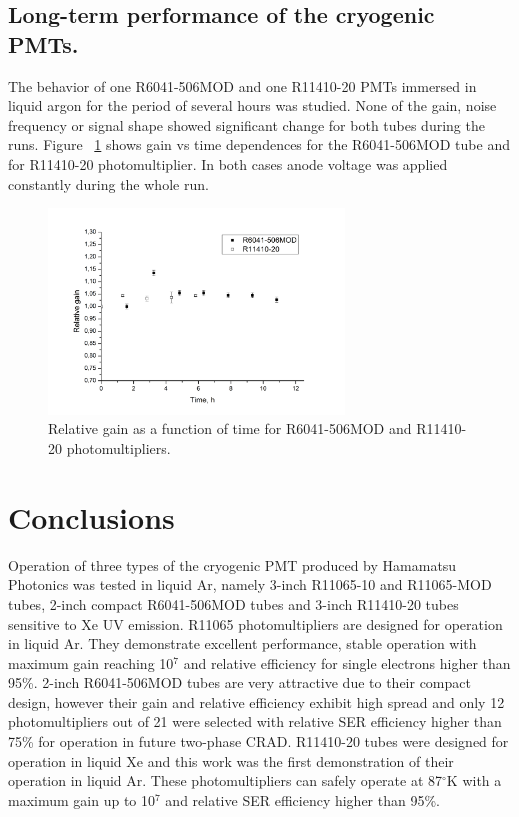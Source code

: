 \documentclass[a4paper,11pt]{article}
\begin{document}
\subsection{Long-term performance of the cryogenic PMTs.}

The behavior of one R6041-506MOD and one R11410-20 PMTs immersed in liquid argon for the
period of several hours was studied. None of the gain, noise frequency or signal shape showed
significant change for both tubes during the runs. Figure ~\ref{fig:long_runs} shows gain vs time dependences for the
R6041-506MOD tube  and for R11410-20 photomultiplier. In both cases anode voltage was applied constantly during the whole run.
\begin{figure}[htbp]
\centering
\includegraphics[width=0.7\textwidth,viewport=100 1 700 550,clip]{figures/long_runs.png}
\caption{Relative gain as a function of time for R6041-506MOD and R11410-20 photomultipliers.}
\label{fig:long_runs}
\end{figure}


\section{Conclusions}

Operation of three types of the cryogenic PMT produced by Hamamatsu Photonics was tested in liquid Ar, namely 3-inch R11065-10 and R11065-MOD tubes,
2-inch compact R6041-506MOD tubes and 3-inch R11410-20 tubes sensitive to Xe UV emission. R11065 photomultipliers are designed for operation in liquid Ar.
They demonstrate excellent performance, stable operation with maximum gain reaching 10$^7$ and relative efficiency for single electrons higher than 95\%.
2-inch R6041-506MOD tubes are very attractive due to their compact design, however their gain and relative efficiency exhibit high spread and only 12
photomultipliers out of 21 were selected with relative SER efficiency higher than 75\% for operation in future two-phase CRAD. R11410-20 tubes were
designed for operation in liquid Xe and this work was the first demonstration of their operation in liquid Ar. These photomultipliers can safely operate 
at  87$^{\circ}$K with a maximum gain up to 10$^7$ and relative SER efficiency higher than 95\%.   
\end{document}

